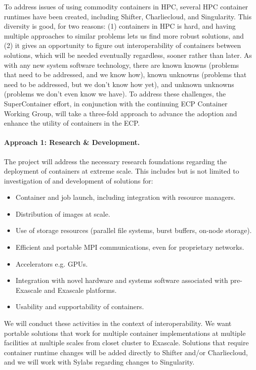 To address issues of using commodity containers in HPC, several HPC container runtimes have been created, including Shifter, Charliecloud, and Singularity. This diversity is good, for two reasons: (1) containers in HPC is hard, and having multiple approaches to similar problems lets us find more robust solutions, and (2) it gives an opportunity to figure out interoperability of containers between solutions, which will be needed eventually regardless, sooner rather than later.  As with any new system software technology, there are known knowns (problems that need to be addressed, and we know how), known unknowns (problems that need to be addressed, but we don’t know how yet), and unknown unknowns (problems we don’t even know we have).  To address these challenges, the SuperContainer effort, in conjunction with the continuing ECP Container Working Group, will take a three-fold approach to advance the adoption and enhance the utility of containers in the ECP. 

\paragraph{Approach 1: Research \& Development.}
The project will address the necessary research foundations regarding the deployment of containers at extreme scale. This includes but is not limited to investigation of and development of solutions for:
\begin{itemize}
\item Container and job launch, including integration with resource managers.
\item	Distribution of images at scale.
\item	Use of storage resources (parallel file systems, burst buffers, on-node storage).
\item	Efficient and portable MPI communications, even for proprietary networks.
\item	Accelerators e.g. GPUs.
\item	Integration with novel hardware and systems software associated with pre-Exascale and  Exascale platforms.
\item	Usability and supportability of containers.
\end{itemize}

We will conduct these activities in the context of interoperability. We want portable solutions that work for multiple container implementations at multiple facilities at multiple scales from closet cluster to Exascale.
Solutions that require container runtime changes will be added directly to Shifter and/or Charliecloud, and we will work with Sylabs regarding changes to Singularity.

